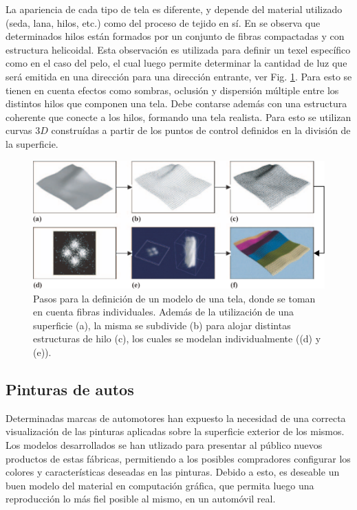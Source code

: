 La apariencia de cada tipo de tela es diferente, y depende del material utilizado (seda, lana, hilos, etc.) como del proceso de tejido en sí.
En \cite{Xu2001} se observa que determinados hilos están formados por un conjunto de fibras compactadas y con estructura helicoidal.
Esta observación es utilizada para definir un texel específico como en el caso del pelo, el cual luego permite determinar la cantidad de luz que será emitida en una dirección para una dirección entrante, ver Fig. \ref{fg:tela}.
Para esto se tienen en cuenta efectos como sombras, oclusión y dispersión múltiple entre los distintos hilos que componen una tela.
Debe contarse además con una estructura coherente que conecte a los hilos, formando una tela realista.
Para esto se utilizan curvas $3D$ construídas a partir de los puntos de control definidos en la división de la superficie.


\begin{figure}
\center
\includegraphics[width=13cm]{figures/tela}
\caption[Pasos para la definición de un modelo de una tela]{Pasos para la definición de un modelo de una tela, donde se toman en cuenta fibras individuales. Además de la utilización de una superficie (a), la misma se subdivide (b) para alojar distintas estructuras de hilo (c), los cuales se modelan individualmente ((d) y (e)).}
\label{fg:tela}
\end{figure}

\subsection{Pinturas de autos}
Determinadas marcas de automotores han expuesto la necesidad de una correcta visualización de las pinturas aplicadas sobre la superficie exterior de los mismos.
Los modelos desarrollados se han utlizado para presentar al público nuevos productos de estas fábricas, permitiendo a los posibles compradores configurar los colores y características deseadas en las pinturas.
Debido a esto, es deseable un buen modelo del material en computación gráfica, que permita luego una reproducción lo más fiel posible al mismo, en un automóvil real.

